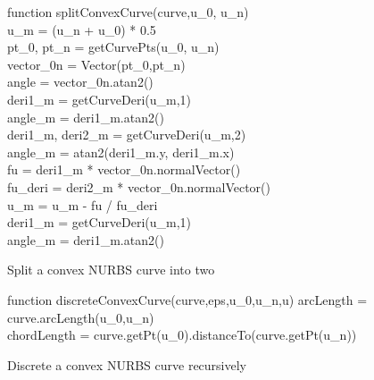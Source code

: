 \begin{algorithm}
    function splitConvexCurve(curve,u\_0, u\_n) \\
    u\_m = (u\_n + u\_0) * 0.5 \\
    pt\_0, pt\_n = getCurvePts(u\_0, u\_n) \\
    vector\_0n = Vector(pt\_0,pt\_n) \\
    angle = vector\_0n.atan2() \\
    deri1\_m = getCurveDeri(u\_m,1) \\
    angle\_m = deri1\_m.atan2() \\
      {
        deri1\_m, deri2\_m = getCurveDeri(u\_m,2) \\
        angle\_m = atan2(deri1\_m.y, deri1\_m.x)  \\
        fu = deri1\_m * vector\_0n.normalVector() \\
        fu\_deri = deri2\_m * vector\_0n.normalVector() \\
        u\_m = u\_m - fu / fu\_deri \\
        deri1\_m = getCurveDeri(u\_m,1) \\
        angle\_m = deri1\_m.atan2()
      }
    \caption{Split a convex NURBS curve into two}
    \label{qdt_alg:split_convex_nurbs}
\end{algorithm}
%
%
\begin{algorithm}
    function discreteConvexCurve(curve,eps,u\_0,u\_n,u)
    arcLength = curve.arcLength(u\_0,u\_n) \\
    chordLength = curve.getPt(u\_0).distanceTo(curve.getPt(u\_n)) \\
\caption{Discrete a convex NURBS curve recursively}
\label{qdt_alg:discrete_convex_nurbs}
\end{algorithm}

